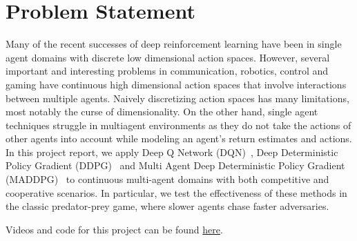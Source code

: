 
\section{Problem Statement}
\label{sec:problem}

Many of the recent successes of deep reinforcement learning have been in
single agent domains with discrete low dimensional action spaces. However, 
several important and interesting problems in communication, robotics, control
and gaming have continuous high dimensional action spaces that involve interactions
between multiple agents. Naively discretizing action spaces has many limitations,
most notably the curse of dimensionality. On the other hand, single agent techniques
struggle in multiagent environments as they do not take the actions of other agents
into account while modeling an agent's return estimates and actions. In this project
report, we apply Deep Q Network (DQN)~\cite{mnih2016dqn}, Deep Deterministic Policy Gradient (DDPG)~\cite{lillicrap2016continuous} and Multi Agent Deep Deterministic Policy Gradient (MADDPG)~\cite{lowe2017multi} to continuous multi-agent
domains with both competitive and cooperative scenarios. In particular, we test the 
effectiveness of these methods in the classic predator-prey game, where slower agents 
chase faster adversaries.

Videos and code for this project can be found \href{https://github.com/camellyx/10707-deep-learning-project/tree/master/multiagent-particle-envs}{here}.
 
